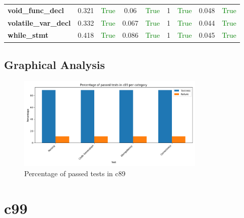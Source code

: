 \documentclass{article}
\begin{document}
\begin{xltabular}{\textwidth}{lcccccccc}
\textbf{{\fontsize{10}{12}\selectfont void\_func\_decl}}& 0.321&\textcolor{green}{True}& 0.06&\textcolor{green}{True}& 1&\textcolor{green}{True}& 0.048&\textcolor{green}{True} \\[0.5ex]
\textbf{{\fontsize{10}{12}\selectfont volatile\_var\_decl}}& 0.332&\textcolor{green}{True}& 0.067&\textcolor{green}{True}& 1&\textcolor{green}{True}& 0.044&\textcolor{green}{True} \\[0.5ex]
\textbf{{\fontsize{10}{12}\selectfont while\_stmt}}& 0.418&\textcolor{green}{True}& 0.086&\textcolor{green}{True}& 1&\textcolor{green}{True}& 0.045&\textcolor{green}{True} \\[0.5ex]
\bottomrule
\end{xltabular}
\newpage
\subsection{Graphical Analysis}
\begin{figure}[h!]
\centering
\includegraphics[width=0.8\textwidth]{../reports/clava/images/c89_percentage.png}
\caption{Percentage of passed tests in c89}
\label{fig:c89_percentage}
\end{figure}
\newpage
\section{c99}
\end{document}
